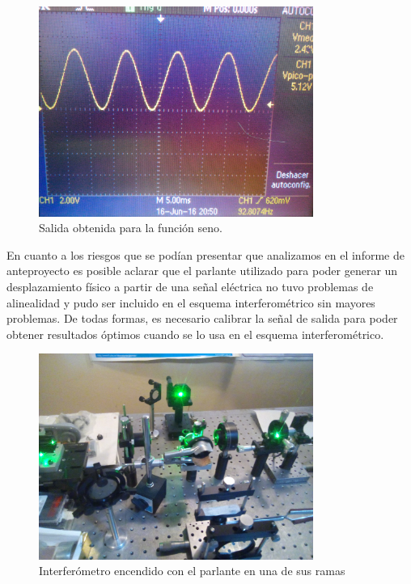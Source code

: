 \begin{figure}[H]
  \centering
  \includegraphics[width=0.8\textwidth]{images/resultados_seno_precargadav2.jpg}
  \caption{Salida obtenida para la función seno.}
  \label{fig:salida_seno}
\end{figure}

En cuanto a los riesgos que se podían presentar que analizamos en el informe de anteproyecto es posible aclarar que el parlante utilizado para poder generar un desplazamiento físico a partir de una señal eléctrica no tuvo problemas de alinealidad y pudo ser incluido en el esquema interferométrico sin mayores problemas. De todas formas, es necesario calibrar la señal de salida para poder obtener resultados óptimos cuando se lo usa en el esquema interferométrico.\\

\begin{figure}[H]
  \centering
  \includegraphics[width=0.8\textwidth]{images/interferometro2.jpg}
  \caption{Interferómetro encendido con el parlante en una de sus ramas}
  \label{fig:interferometro_encendido}
\end{figure}

